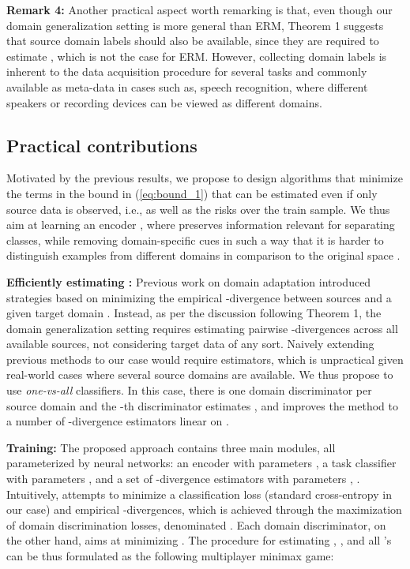 \documentclass{article}
\begin{document}
\textbf{Remark 4:} Another practical aspect worth remarking is that, even though our domain generalization setting is more general than ERM, Theorem 1 suggests that source domain labels should also be available, since they are required to estimate , which is not the case for ERM. However, collecting domain labels is inherent to the data acquisition procedure for several tasks and commonly available as meta-data in cases such as, speech recognition, where different speakers or recording devices can be viewed as different domains.

\subsection{Practical contributions}
Motivated by the previous results, we propose to design algorithms that minimize the terms in the bound in (\ref{eq:bound_1}) that can be estimated even if only source data is observed, i.e.,  as well as the risks over the train sample. We thus aim at learning an encoder , where  preserves information relevant for separating classes, while removing domain-specific cues in such a way that it is harder to distinguish examples from different domains in comparison to the original space .  

\textbf{Efficiently estimating :} Previous work on domain adaptation introduced strategies based on minimizing the empirical -divergence between sources and a given target domain \cite{ganin2016domain, zhao2018adversarial}. Instead, as per the discussion following Theorem 1, the domain generalization setting requires estimating pairwise -divergences across all available sources, not considering target data of any sort. Naively extending previous methods to our case would require  estimators, which is unpractical given real-world cases where several source domains are available. We thus propose to use {\em one-vs-all} classifiers. In this case, there is one domain discriminator per source domain and the -th discriminator estimates , and improves the method to a number of -divergence estimators linear on .

\textbf{Training:} 
The proposed approach contains three main modules, all parameterized by neural networks: an encoder  with parameters , a task classifier  with parameters , and a set of -divergence estimators  with parameters , . Intuitively,  attempts to minimize a classification loss  (standard cross-entropy in our case) and empirical -divergences, which is achieved through the maximization of domain discrimination losses, denominated . Each domain discriminator, on the other hand, aims at minimizing . The procedure for estimating , , and all 's can be thus formulated as the following multiplayer minimax game:   
\end{document}
